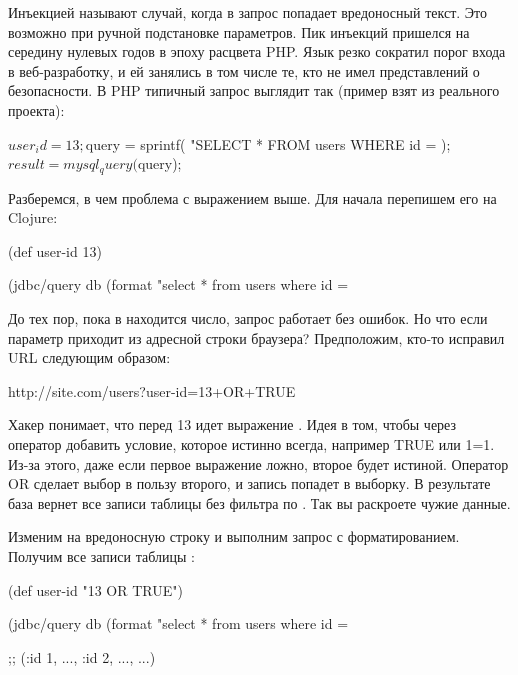 Инъекцией называют случай, когда в запрос попадает вредоносный текст. Это возможно при ручной подстановке параметров. Пик инъекций пришелся на середину нулевых годов в эпоху расцвета PHP. Язык резко сократил порог входа в веб-разработку, и ей занялись в том числе те, кто не имел представлений о безопасности. В PHP типичный запрос выглядит так (пример взят из реального проекта):

\begin{english}
  \begin{php}
$user_id = 13;
$query = sprintf(
  "SELECT * FROM users WHERE id = %
);
$result = mysql_query($query);
  \end{php}
\end{english}

Разберемся, в чем проблема с выражением выше. Для начала перепишем его на Clojure:

\begin{english}
  \begin{clojure}
(def user-id 13)

(jdbc/query db
  (format "select * from users where id = %
  \end{clojure}
\end{english}

До тех пор, пока в  находится число, запрос работает без ошибок. Но что если параметр приходит из адресной строки браузера? Предположим, кто-то исправил URL следующим образом:

\begin{english}
  \begin{text}
http://site.com/users?user-id=13+OR+TRUE
  \end{text}
\end{english}

Хакер понимает, что перед 13 идет выражение . Идея в том, чтобы через оператор  добавить условие, которое истинно всегда, например TRUE или 1=1. Из-за этого, даже если первое выражение ложно, второе будет истиной. Оператор OR сделает выбор в пользу второго, и запись попадет в выборку. В результате база вернет все записи таблицы без фильтра по . Так вы раскроете чужие данные.

Изменим  на вредоносную строку и выполним запрос с форматированием. Получим все записи таблицы :

\begin{english}
  \begin{clojure}
(def user-id "13 OR TRUE")

(jdbc/query db
  (format "select * from users where id = %

;; ({:id 1, ...}, {:id 2, ...}, ...)
  \end{clojure}
\end{english}

